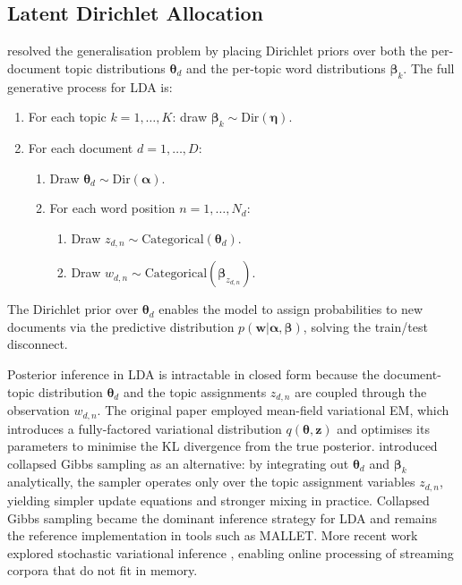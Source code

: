 \documentclass[11pt,a4paper]{article}
\newcommand{\vect}[1]{\boldsymbol{#1}}
\begin{document}
\subsection{Latent Dirichlet Allocation}
\label{sec:lda}

\textcite{blei2003latent} resolved the generalisation problem by placing
Dirichlet priors over both the per-document topic distributions
$\vect{\theta}_{d}$ and the per-topic word distributions
$\vect{\beta}_{k}$.
The full generative process for LDA is:
\begin{enumerate}
  \item For each topic $k = 1, \ldots, K$: draw
    $\vect{\beta}_{k} \sim \mathrm{Dir}(\vect{\eta})$.
  \item For each document $d = 1, \ldots, D$:
    \begin{enumerate}
      \item Draw $\vect{\theta}_{d} \sim \mathrm{Dir}(\vect{\alpha})$.
      \item For each word position $n = 1, \ldots, N_{d}$:
        \begin{enumerate}
          \item Draw $z_{d,n} \sim \mathrm{Categorical}(\vect{\theta}_{d})$.
          \item Draw $w_{d,n} \sim \mathrm{Categorical}(\vect{\beta}_{z_{d,n}})$.
        \end{enumerate}
    \end{enumerate}
\end{enumerate}
The Dirichlet prior over $\vect{\theta}_{d}$ enables the model to
assign probabilities to new documents via the predictive distribution
$p(\mathbf{w}|\vect{\alpha},\vect{\beta})$, solving the train/test
disconnect.

Posterior inference in LDA is intractable in closed form because the
document-topic distribution $\vect{\theta}_{d}$ and the topic
assignments $z_{d,n}$ are coupled through the observation $w_{d,n}$.
The original paper \parencite{blei2003latent} employed mean-field
variational EM, which introduces a fully-factored variational distribution
$q(\vect{\theta},\mathbf{z})$ and optimises its parameters to minimise
the KL divergence from the true posterior.
\textcite{griffiths2004finding} introduced collapsed Gibbs sampling as
an alternative: by integrating out $\vect{\theta}_{d}$ and $\vect{\beta}_{k}$
analytically, the sampler operates only over the topic assignment
variables $z_{d,n}$, yielding simpler update equations and stronger
mixing in practice.
Collapsed Gibbs sampling became the dominant inference strategy for LDA
and remains the reference implementation in tools such as MALLET.
More recent work explored stochastic variational inference
\parencite{blei2012probabilistic}, enabling online processing of
streaming corpora that do not fit in memory.
\end{document}

